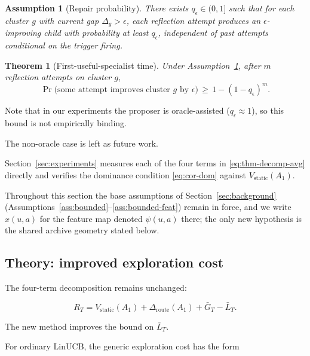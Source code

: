 \documentclass{article} %
\newtheorem{theorem}{Theorem}
\newtheorem{assumption}{Assumption}
\providecommand{\Rstatic}{V_{\mathrm{static}}}
\providecommand{\Droute}{\Delta_{\mathrm{route}}}
\begin{document}
\begin{assumption}[Repair probability]
\label{ass:repair}
There exists $q_\epsilon \in (0,1]$ such that for each cluster $g$ with current gap $\Delta_g > \epsilon$, each reflection attempt produces an $\epsilon$-improving child with probability at least $q_\epsilon$, independent of past attempts conditional on the trigger firing.
\end{assumption}

\begin{theorem}[First-useful-specialist time]
\label{thm:specialist}
Under Assumption~\ref{ass:repair}, after $m$ reflection attempts on cluster $g$,
\begin{equation}
\label{eq:thm-specialist}
\Pr\bigl(\text{some attempt improves cluster } g \text{ by } \epsilon\bigr) \,\ge\, 1 - (1 - q_\epsilon)^m.
\end{equation}
\end{theorem}

Note that in our experiments the proposer is oracle-assisted ($q_\epsilon \approx 1$), so this bound is not empirically binding.

The non-oracle case is left as future work.

Section~\ref{sec:experiments} measures each of the four terms in \eqref{eq:thm-decomp-avg} directly and verifies the dominance condition \eqref{eq:cor-dom} against $V_{\mathrm{static}}(A_1)$.




Throughout this section the base assumptions of Section~\ref{sec:background} (Assumptions~\ref{ass:bounded}--\ref{ass:bounded-feat}) remain in force, and we write $x(u,a)$ for the feature map denoted $\psi(u,a)$ there; the only new hypothesis is the shared archive geometry stated below.

\label{sec:theory}




\subsection{Theory: improved exploration cost}

The four-term decomposition remains unchanged:

\[
R_T = \Rstatic(A_1) + \Droute(A_1) + \bar{G}_T - \bar{L}_T .
\]

The new method improves the bound on $\bar{L}_T$.

For ordinary LinUCB, the generic exploration cost has the form
\end{document}
